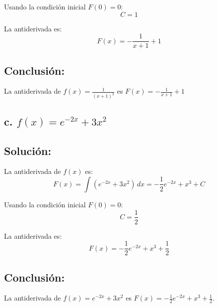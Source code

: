 \documentclass{article}
\begin{document}
\noindent Usando la condición inicial \( F(0) = 0 \):
\[
C = 1
\]

\noindent La antiderivada es:
\[
F(x) = -\frac{1}{x+1} + 1
\]

\subsection*{Conclusión:}

La antiderivada de \( f(x) = \frac{1}{(x+1)^2} \) es \( F(x) = -\frac{1}{x+1} + 1 \)

\subsection*{\newline c. \(f(x) = e^{-2x} + 3x^2\)}
\subsection*{Solución: }

La antiderivada de \( f(x) \) es:
\[
F(x) = \int (e^{-2x} + 3x^2) \, dx = -\frac{1}{2}e^{-2x} + x^3 + C
\]

\noindent Usando la condición inicial \( F(0) = 0 \):
\[
C = \frac{1}{2}
\]

\noindent La antiderivada es:
\[
F(x) = -\frac{1}{2}e^{-2x} + x^3 + \frac{1}{2}
\]

\subsection*{Conclusión:}

La antiderivada de \( f(x) = e^{-2x} + 3x^2 \) es \( F(x) = -\frac{1}{2}e^{-2x} + x^3 + \frac{1}{2} \).
\end{document}
